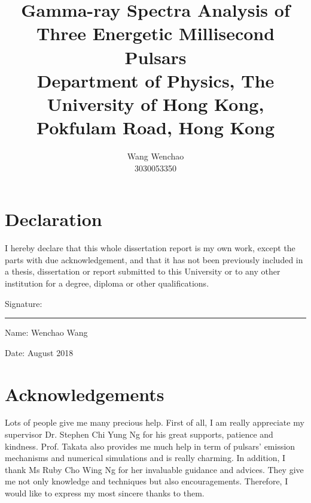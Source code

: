 \documentclass[12pt]{report}
\title{\textbf{Gamma-ray Spectra Analysis of Three Energetic Millisecond Pulsars} \\ \vspace{1cm}
  {\large Department of Physics, The University of Hong Kong, Pokfulam Road, Hong Kong}}
\date{}
\author{Wang Wenchao  \\3030053350}
\begin{document}
\linespread{1.25} 
\maketitle



\cleardoublepage
{}
\chapter*{Declaration}
  \doublespacing 
  I hereby declare that this whole dissertation report is my own work, except the parts with due
  acknowledgement, and that it has not been previously included in a thesis, dissertation or
  report submitted to this University or to any other institution for a degree, diploma or other
  qualifications. \\ \vspace{3cm}

  \hspace{7cm} Signature: \rule{3cm}{0.4pt} 

  \hspace*{7.5cm} Name:  Wenchao Wang 

  \hspace*{7.6cm} Date:  August 2018 

\cleardoublepage
{}
\chapter*{Acknowledgements}
  \doublespacing
  Lots of people give me many precious help. First of all, I am really appreciate my 
  supervisor Dr. Stephen Chi Yung Ng for his great supports, patience and kindness. Prof. Takata 
  also provides me much help in term of pulsars' emission mechanisms and numerical simulations and 
  is really charming. In addition, I thank Ms Ruby Cho Wing Ng for her invaluable guidance and 
  advices. They give me not only knowledge and techniques but also encouragements. Therefore, I 
  would like to express my most sincere thanks to them.  

\cleardoublepage
{}
\end{document}

